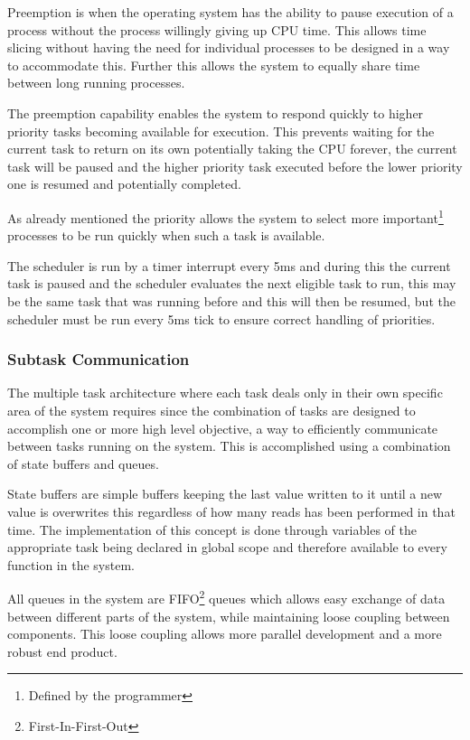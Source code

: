 \documentclass[../../../main]{subfiles}
\begin{document}
Preemption is when the operating system has the ability to pause execution of a process without the process willingly giving up CPU time. This allows time slicing without having the need for individual processes to be designed in a way to accommodate this. Further this allows the system to equally share time between long running processes.

The preemption capability enables the system to respond quickly to higher priority tasks becoming available for execution. This prevents waiting for the current task to return on its own potentially taking the CPU forever, the current task  will be paused and the higher priority task executed before the lower priority one is resumed and potentially completed.

As already mentioned the priority allows the system to select more important\footnote{Defined by the programmer} processes to be run quickly when such a task is available. 

The scheduler is run by a timer interrupt every 5ms and during this the current task is paused and the scheduler evaluates the next eligible task to run, this may be the same task that was running before and this will then be resumed, but the scheduler must be run every 5ms tick to ensure correct handling of priorities.

\subsubsection{Subtask Communication}

The multiple task architecture where each task deals only in their own specific area of the system requires since the combination of tasks are designed to accomplish one or more high level objective, a way to efficiently communicate between tasks running on the system.
This is accomplished using a combination of state buffers and queues.

State buffers are simple buffers keeping the last value written to it until a new value is overwrites this regardless of how many reads has been performed in that time. The implementation of this concept is done through variables of the appropriate task being declared in global scope and therefore available to every function in the system.

All queues in the system are FIFO\footnote{First-In-First-Out} queues which allows easy exchange of data between different parts of the system, while maintaining loose coupling between components. This loose coupling allows more parallel development and a more robust end product.
\end{document}
